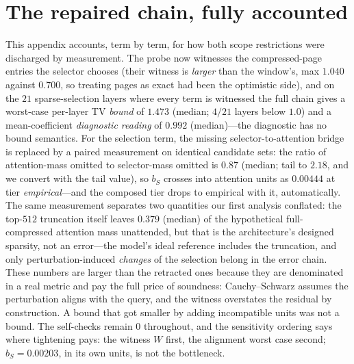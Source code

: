 \documentclass[11pt]{article}
\begin{document}
\section{The repaired chain, fully accounted}
\label{app:composition}
This appendix accounts, term by term, for how both scope restrictions were
discharged by measurement. The probe now witnesses the compressed-page entries the selector chooses
(their witness is \emph{larger} than the window's, max $1.040$ against
$0.700$, so treating pages as exact had been the optimistic side), and on the
$21$ sparse-selection layers where every term is witnessed the full chain gives
a worst-case per-layer TV \emph{bound} of $1.473$ (median; $4/21$
layers below $1.0$) and a mean-coefficient \emph{diagnostic reading} of
$0.992$ (median)---the diagnostic has no bound semantics. For the selection term, the missing
selector-to-attention bridge is replaced by a paired measurement on identical
candidate sets: the ratio of attention-mass omitted to selector-mass omitted is
$0.87$ (median; tail to $2.18$, and we convert with the tail value),
so $b_S$ crosses into attention units as $0.00444$ at tier
\emph{empirical}---and the composed tier drops to empirical with it, automatically.
The same measurement separates two quantities our first analysis conflated: the
top-$512$ truncation itself leaves $0.379$ (median) of the hypothetical
full-compressed attention mass unattended, but that is the architecture's designed
sparsity, not an error---the model's ideal reference includes the truncation, and
only perturbation-induced \emph{changes} of the selection belong in the error
chain. These numbers
are larger than the retracted ones because they are denominated in a real metric and
pay the full price of soundness: Cauchy--Schwarz assumes the perturbation aligns
with the query, and the witness overstates the residual by construction. A bound
that got smaller by adding incompatible units was not a bound. The self-checks
remain $0$ throughout, and the sensitivity ordering says where tightening pays: the
witness $W$ first, the alignment worst case second; $b_S=0.00203$, in its own
units, is not the bottleneck.

\end{document}
